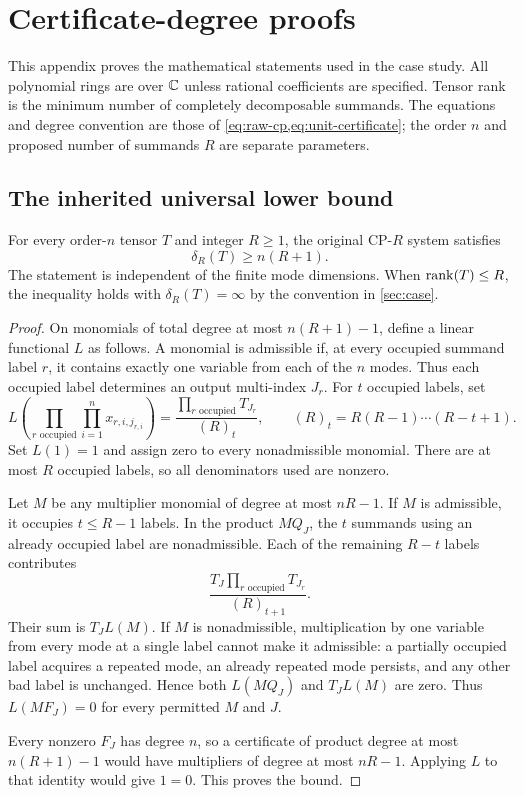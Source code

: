 \section{Certificate-degree proofs}\label{app:math}

This appendix proves the mathematical statements used in the case study. All polynomial rings are over $\mathbb{C}$ unless rational coefficients are specified. Tensor rank is the minimum number of completely decomposable summands. The equations and degree convention are those of \cref{eq:raw-cp,eq:unit-certificate}; the order $n$ and proposed number of summands $R$ are separate parameters.

\subsection{The inherited universal lower bound}

\begin{lemma}\label{lem:lower}
For every order-$n$ tensor $T$ and integer $R\ge1$, the original CP-$R$ system satisfies
\[
                         \delta_R(T)\ge n(R+1).
\]
The statement is independent of the finite mode dimensions. When $\operatorname{rank}(T)\le R$, the inequality holds with $\delta_R(T)=\infty$ by the convention in \cref{sec:case}.
\end{lemma}

\begin{proof}
On monomials of total degree at most $n(R+1)-1$, define a linear functional $L$ as follows. A monomial is admissible if, at every occupied summand label $r$, it contains exactly one variable from each of the $n$ modes. Thus each occupied label determines an output multi-index $J_r$. For $t$ occupied labels, set
\[
 L\!\left(\prod_{r\text{ occupied}}\prod_{i=1}^n x_{r,i,j_{r,i}}\right)
    =\frac{\prod_{r\text{ occupied}}T_{J_r}}{(R)_t},
 \qquad (R)_t=R(R-1)\cdots(R-t+1).
\]
Set $L(1)=1$ and assign zero to every nonadmissible monomial. There are at most $R$ occupied labels, so all denominators used are nonzero.

Let $M$ be any multiplier monomial of degree at most $nR-1$. If $M$ is admissible, it occupies $t\le R-1$ labels. In the product $MQ_J$, the $t$ summands using an already occupied label are nonadmissible. Each of the remaining $R-t$ labels contributes
\[
 \frac{T_J\prod_{r\text{ occupied}}T_{J_r}}{(R)_{t+1}}.
\]
Their sum is $T_JL(M)$. If $M$ is nonadmissible, multiplication by one variable from every mode at a single label cannot make it admissible: a partially occupied label acquires a repeated mode, an already repeated mode persists, and any other bad label is unchanged. Hence both $L(MQ_J)$ and $T_JL(M)$ are zero. Thus $L(MF_J)=0$ for every permitted $M$ and $J$.

Every nonzero $F_J$ has degree $n$, so a certificate of product degree at most $n(R+1)-1$ would have multipliers of degree at most $nR-1$. Applying $L$ to that identity would give $1=0$. This proves the bound.
\end{proof}

